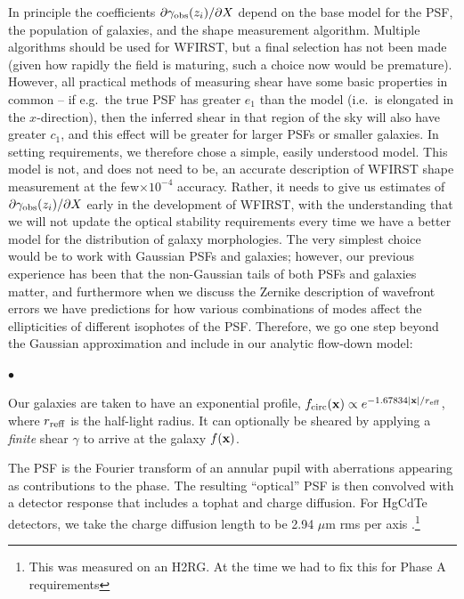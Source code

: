 \documentclass[aps,prd, amsmath,amssymb,superscriptaddress,showkeys,nofootinbib,reprint,preprintnumbers]{revtex4-1}
\begin{document}
\begin{widetext}
In principle the coefficients $\partial\gamma_{\rm obs}(z_i)/\partial X$ depend on the base model for the PSF, the population of galaxies, and the shape measurement algorithm. Multiple algorithms should be used for WFIRST, but a final selection has not been made (given how rapidly the field is maturing, such a choice now would be premature). However, all practical methods of measuring shear have some basic properties in common -- if e.g.\ the true PSF has greater $e_1$ than the model (i.e.\ is elongated in the $x$-direction), then the inferred shear in that region of the sky will also have greater $c_1$, and this effect will be greater for larger PSFs or smaller galaxies. In setting requirements, we therefore chose a simple, easily understood model. This model is not, and does not need to be, an accurate description of WFIRST shape measurement at the few$\times 10^{-4}$ accuracy. Rather, it needs to give us estimates of $\partial\gamma_{\rm obs}(z_i)/\partial X$ early in the development of WFIRST, with the understanding that we will not update the optical stability requirements every time we have a better model for the distribution of galaxy morphologies. The very simplest choice would be to work with Gaussian PSFs and galaxies; however, our previous experience has been that the non-Gaussian tails of both PSFs and galaxies matter, and furthermore when we discuss the Zernike description of wavefront errors we have predictions for how various combinations of modes affect the ellipticities of different isophotes of the PSF. Therefore, we go one step beyond the Gaussian approximation and include in our analytic flow-down model:
\begin{list}{$\bullet$}{}
\item Our galaxies are taken to have an exponential profile, $f_{\rm circ}({\bf x}) \propto e^{-1.67834|{\bf x}|/r_{\rm eff}}$, where $r_{\rm reff}$ is the half-light radius. It can optionally be sheared by applying a {\em finite} shear $\gamma$ to arrive at the galaxy $f({\bf x})$.
\item The PSF is the Fourier transform of an
annular pupil with aberrations appearing as contributions to the
phase. The resulting ``optical'' PSF is then convolved with a detector
response that includes a tophat and charge diffusion. For HgCdTe
detectors, we take the charge diffusion length to be 2.94 $\mu$m rms
per axis \cite{2007PASP..119..466B}.\footnote{This was measured on an H2RG. At the time we had to fix this for Phase A requirements
}
\end{list}
\end{widetext}
\end{document}

